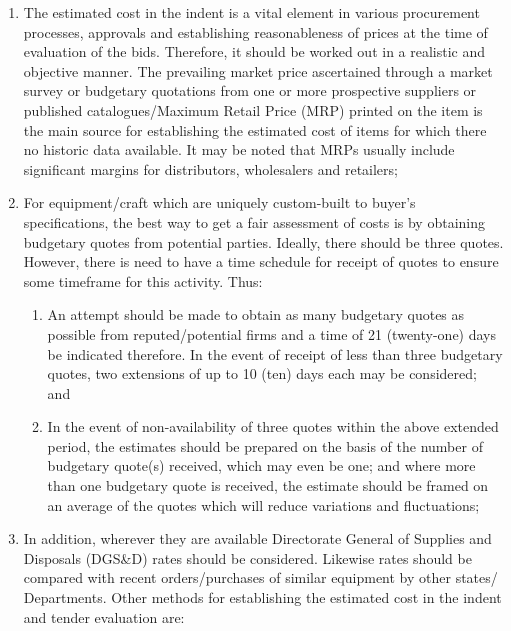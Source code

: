 \documentclass[
  11pt,
  twoside]{article}
\providecommand{\tightlist}{%
  \setlength{\itemsep}{0pt}\setlength{\parskip}{0pt}}
\begin{document}
\begin{enumerate}
\def\labelenumi{\arabic{enumi}.}
\item
  The estimated cost in the indent is a vital element in various procurement processes, approvals and establishing reasonableness of prices at the time of evaluation of the bids. Therefore, it should be worked out in a realistic and objective manner. The prevailing market price ascertained through a market survey or budgetary quotations from one or more prospective suppliers or published catalogues/Maximum Retail Price (MRP) printed on the item is the main source for establishing the estimated cost of items for which there no historic data available. It may be noted that MRPs usually include significant margins for distributors, wholesalers and retailers;
\item
  For equipment/craft which are uniquely custom-built to buyer's specifications, the best way to get a fair assessment of costs is by obtaining budgetary quotes from potential parties. Ideally, there should be three quotes. However, there is need to have a time schedule for receipt of quotes to ensure some timeframe for this activity. Thus:

  \begin{enumerate}
  \def\labelenumii{\alph{enumii})}
  \tightlist
  \item
    An attempt should be made to obtain as many budgetary quotes as possible from reputed/potential firms and a time of 21 (twenty-one) days be indicated therefore. In the event of receipt of less than three budgetary quotes, two extensions of up to 10 (ten) days each may be considered; and
  \item
    In the event of non-availability of three quotes within the above extended period, the estimates should be prepared on the basis of the number of budgetary quote(s) received, which may even be one; and where more than one budgetary quote is received, the estimate should be framed on an average of the quotes which will reduce variations and fluctuations;
  \end{enumerate}
\item
  In addition, wherever they are available Directorate General of Supplies and Disposals (DGS\&D) rates should be considered. Likewise rates should be compared with recent orders/purchases of similar equipment by other states/ Departments. Other methods for establishing the estimated cost in the indent and tender evaluation are:


\end{enumerate}
\end{document}

